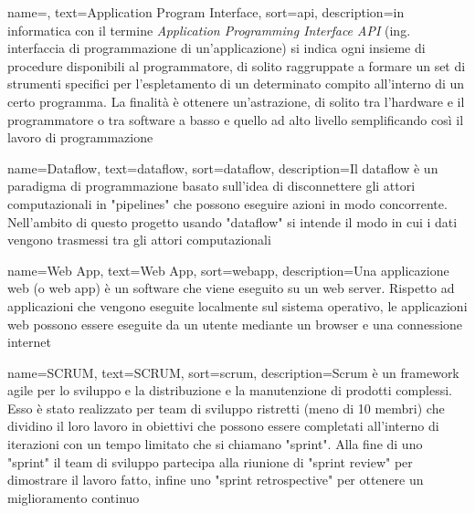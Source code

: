 
\renewcommand{\acronymname}{Acronimi e abbreviazioni}




{
    name=,
    text=Application Program Interface,
    sort=api,
    description={in informatica con il termine \emph{Application Programming Interface API} (ing. interfaccia di programmazione di un'applicazione) si indica ogni insieme di procedure disponibili al programmatore, di solito raggruppate a formare un set di strumenti specifici per l'espletamento di un determinato compito all'interno di un certo programma. La finalità è ottenere un'astrazione, di solito tra l'hardware e il programmatore o tra software a basso e quello ad alto livello semplificando così il lavoro di programmazione}
}


{
    name=Dataflow,
    text=dataflow,
    sort=dataflow,
    description={Il dataflow è un paradigma di programmazione basato sull'idea di disconnettere gli attori computazionali in "pipelines" che possono eseguire azioni in modo concorrente. Nell'ambito di questo progetto usando "dataflow" si intende il modo in cui i dati vengono trasmessi tra gli attori computazionali}
}

{
	name=Web App,
	text=Web App,
	sort=webapp,
	description={Una applicazione web (o web app) è un software che viene eseguito su un web server. Rispetto ad applicazioni che vengono eseguite localmente sul sistema operativo, le applicazioni web possono essere eseguite da un utente mediante un browser e una connessione internet}
}

{
	name=SCRUM,
	text=SCRUM,
	sort=scrum,
	description={Scrum è un framework agile per lo sviluppo e la distribuzione e la manutenzione di prodotti complessi. Esso è stato realizzato per team di sviluppo ristretti (meno di 10 membri) che dividino il loro lavoro in obiettivi che possono essere completati all'interno di iterazioni con un tempo limitato che si chiamano "sprint". Alla fine di uno "sprint" il team di sviluppo partecipa alla riunione di "sprint review" per dimostrare il lavoro fatto, infine uno "sprint retrospective" per ottenere un miglioramento continuo}
}

